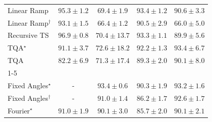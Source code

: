 \begin{tabular}{l|cccc|}
Linear Ramp & {\cellcolor[HTML]{7C2C05}} \color[HTML]{F1F1F1} $95.3\pm 1.2$ & {\cellcolor[HTML]{FEC24D}} \color[HTML]{000000} $69.4\pm 1.9$ & {\cellcolor[HTML]{8E3104}} \color[HTML]{F1F1F1} $93.4\pm 1.2$ & {\cellcolor[HTML]{A83B03}} \color[HTML]{F1F1F1} $90.6\pm 3.3$ \\
Linear Ramp$^\dagger$ & {\cellcolor[HTML]{913204}} \color[HTML]{F1F1F1} $93.1\pm 1.5$ & {\cellcolor[HTML]{FED36F}} \color[HTML]{000000} $66.4\pm 1.2$ & {\cellcolor[HTML]{A83B03}} \color[HTML]{F1F1F1} $90.5\pm 2.9$ & {\cellcolor[HTML]{FED573}} \color[HTML]{000000} $66.0\pm 5.0$ \\
Recursive TS & {\cellcolor[HTML]{702806}} \color[HTML]{F1F1F1} $96.9\pm 0.8$ & {\cellcolor[HTML]{FEBB47}} \color[HTML]{000000} $70.4\pm 13.7$ & {\cellcolor[HTML]{903104}} \color[HTML]{F1F1F1} $93.3\pm 1.1$ & {\cellcolor[HTML]{AC3D03}} \color[HTML]{F1F1F1} $89.9\pm 5.6$ \\
TQA$^\star$ & {\cellcolor[HTML]{A33904}} \color[HTML]{F1F1F1} $91.1\pm 3.7$ & {\cellcolor[HTML]{FEAB39}} \color[HTML]{000000} $72.6\pm 18.2$ & {\cellcolor[HTML]{993404}} \color[HTML]{F1F1F1} $92.2\pm 1.3$ & {\cellcolor[HTML]{8E3104}} \color[HTML]{F1F1F1} $93.4\pm 6.7$ \\
TQA & {\cellcolor[HTML]{E3660F}} \color[HTML]{F1F1F1} $82.2\pm 6.9$ & {\cellcolor[HTML]{FEB541}} \color[HTML]{000000} $71.3\pm 17.4$ & {\cellcolor[HTML]{B34003}} \color[HTML]{F1F1F1} $89.3\pm 2.0$ & {\cellcolor[HTML]{AB3C03}} \color[HTML]{F1F1F1} $90.1\pm 8.0$ \\
\cline{1-5}
\multicolumn{5}{c}{\rule{0pt}{8pt}PP} \\
\midrule
Fixed Angles$^\star$ & {\cellcolor[HTML]{000000}} \color[HTML]{F1F1F1} {\cellcolor{white}} \color{black} - & {\cellcolor[HTML]{006034}} \color[HTML]{F1F1F1} $93.4\pm 0.6$ & {\cellcolor[HTML]{0B713B}} \color[HTML]{F1F1F1} $90.3\pm 1.9$ & {\cellcolor[HTML]{006234}} \color[HTML]{F1F1F1} $93.2\pm 1.6$ \\
Fixed Angles$^\dagger$ & {\cellcolor[HTML]{000000}} \color[HTML]{F1F1F1} {\cellcolor{white}} \color{black} - & {\cellcolor[HTML]{076D39}} \color[HTML]{F1F1F1} $91.0\pm 1.4$ & {\cellcolor[HTML]{248644}} \color[HTML]{F1F1F1} $86.2\pm 1.7$ & {\cellcolor[HTML]{006536}} \color[HTML]{F1F1F1} $92.6\pm 1.7$ \\
Fourier$^\star$ & {\cellcolor[HTML]{076D39}} \color[HTML]{F1F1F1} $91.0\pm 1.9$ & {\cellcolor[HTML]{0C723B}} \color[HTML]{F1F1F1} $90.1\pm 3.0$ & {\cellcolor[HTML]{278946}} \color[HTML]{F1F1F1} $85.7\pm 2.0$ & {\cellcolor[HTML]{0C723B}} \color[HTML]{F1F1F1} $90.1\pm 2.1$ \\

\end{tabular}
